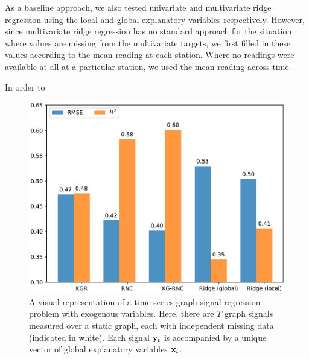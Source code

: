 As a baseline approach, we also tested univariate and multivariate ridge regression using the local and global explanatory variables respectively. However, since multivariate ridge regression has no standard approach for the situation where values are missing from the multivariate targets, we first filled in these values according to the mean reading at each station. Where no readings were available at all at a particular station, we used the mean reading across time. 

In order to 

\begin{figure}[ht]
    \centering
    \includegraphics[width=0.85\linewidth]{Figures/regression_results.pdf}
    \caption[Graph signal regression with exogenous variables]{A visual representation of a time-series graph signal regression problem with exogenous variables. Here, there are $T$ graph signals measured over a static graph, each with independent missing data (indicated in white). Each signal $\mathbf{y}_t$ is accompanied by a unique vector of global explanatory variables $\mathbf{x}_t$. }
    \label{fig:regression_results}
\end{figure}